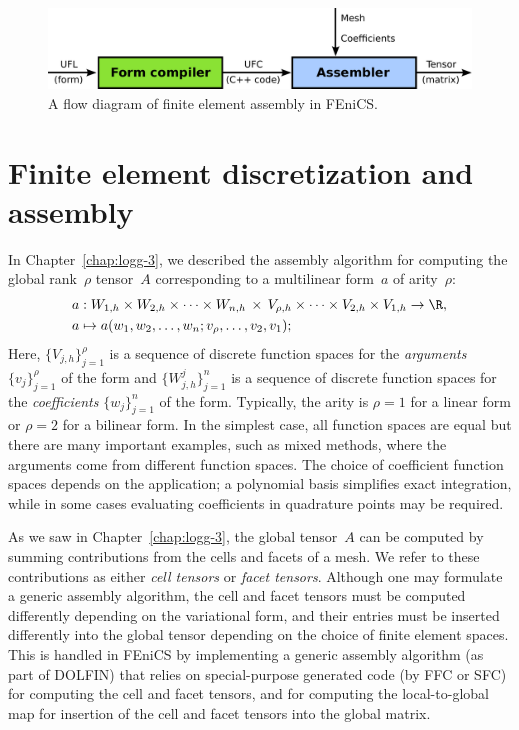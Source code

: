 \begin{figure}
  \begin{center}
    \includegraphics[width=\fullfig]{chapters/alnes-2/pdf/ufc_flowdiagram.pdf}
    \caption{A flow diagram of finite element assembly in FEniCS.}
    \label{fig:alnes-2:ufc_flowdiagram}
  \end{center}
\end{figure}

\section{Finite element discretization and assembly}
\label{sec:alnes-2fem}

In Chapter~\ref{chap:logg-3}, we described the assembly algorithm for
computing the global rank~$\rho$ tensor~$A$ corresponding to a
multilinear form~$a$ of arity~$\rho$:
\begin{equation} \label{eq:varform}
  \begin{split}
    a &: W_{1,h} \times W_{2,h} \times \cdots \times W_{n,h} \, \times \,
    V_{\rho,h} \times \cdots \times V_{2,h} \times V_{1,h} \rightarrow \R, \\
    a &\mapsto a(w_1, w_2, \ldots, w_n; v_{\rho}, \ldots, v_2, v_1);
  \end{split}
\end{equation}
Here, $\{V_{j,h}\}_{j=1}^{\rho}$ is a sequence of discrete function
spaces for the \emph{arguments} $\{v_j\}_{j=1}^{\rho}$ of the form and
$\{W_{j,h}^j\}_{j=1}^n$ is a sequence of discrete function spaces for
the \emph{coefficients} $\{w_j\}_{j=1}^n$ of the form. Typically, the
arity is $\rho=1$ for a linear form or $\rho=2$ for a bilinear
form. In the simplest case, all function spaces are equal but there
are many important examples, such as mixed methods, where the
arguments come from different function spaces. The choice of
coefficient function spaces depends on the application; a polynomial
basis simplifies exact integration, while in some cases evaluating
coefficients in quadrature points may be required.

As we saw in Chapter~\ref{chap:logg-3}, the global tensor~$A$ can be
computed by summing contributions from the cells and facets of a
mesh. We refer to these contributions as either \emph{cell tensors} or
\emph{facet tensors}. Although one may formulate a generic assembly
algorithm, the cell and facet tensors must be computed differently
depending on the variational form, and their entries must be inserted
differently into the global tensor depending on the choice of finite
element spaces. This is handled in FEniCS by implementing a generic
assembly algorithm (as part of DOLFIN) that relies on special-purpose
generated code (by FFC or SFC) for computing the cell and facet
tensors, and for computing the local-to-global map for insertion of
the cell and facet tensors into the global matrix.

